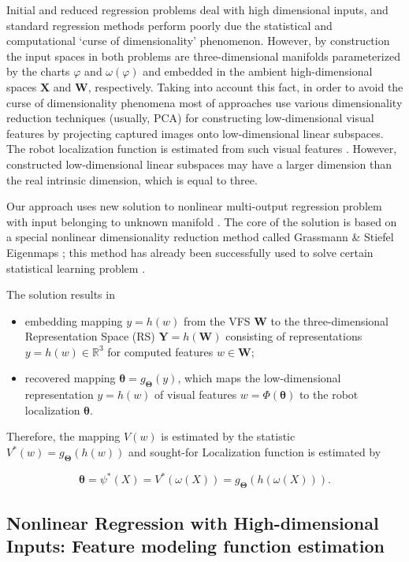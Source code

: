 \documentclass[conference]{IEEEtran} %
\def\mbW{\mathbf{W}}
\def\mbTheta{{\bm\Theta}}
\def\mbtheta{{\bm\theta}}
\def\mbX{\mathbf{X}}
\def\mbY{\mathbf{Y}}
\def\RR{\mathbb{R}}
\begin{document}
Initial and reduced regression problems deal with high dimensional inputs, and standard regression methods perform poorly due the statistical and computational `curse of dimensionality' phenomenon. However, by construction the input spaces in both problems are three-dimensional manifolds parameterized by the charts $\varphi$  and $\omega(\varphi)$ and embedded in the ambient high-dimensional spaces $\mbX$ and $\mbW$, respectively. Taking into account this fact, in order to avoid the curse of dimensionality phenomena most of approaches use various dimensionality reduction techniques (usually, PCA) for constructing low-dimensional visual features by projecting captured images onto low-dimensional linear subspaces. The robot localization function is estimated from such visual features \cite{bib11,bib13,bib14}. However, constructed low-dimensional linear subspaces may have a larger dimension than the real intrinsic dimension, which is equal to three.

Our approach uses new solution to nonlinear multi-output regression problem with input belonging to unknown manifold  \cite{bib20}. The core of the solution is based on a special nonlinear dimensionality reduction method called Grassmann \& Stiefel Eigenmaps \cite{bib21,bib22}; this method has already been successfully used to solve certain statistical learning problem \cite{bib23}.

The solution \cite{bib20} results in
\begin{itemize}
	\item embedding mapping $y = h(w)$ from the VFS $\mbW$ to the three-dimensional Representation Space (RS) $\mbY = h(\mbW)$ consisting of representations $y = h(w) \in \RR^3$ for computed features $w \in \mbW$;
    \item recovered mapping $\mbtheta= g_{\mbTheta}(y)$, which maps the low-dimensional representation $y = h(w)$ of visual features $w = \Phi(\mbtheta)$ to the robot localization $\mbtheta$.
\end{itemize}

Therefore, the mapping $V(w)$ is estimated by the statistic $V^*(w) = g_{\mbTheta}(h(w))$ and sought-for Localization function is estimated by

\begin{equation}
\label{eq6}
	\mbtheta = \psi^*(X) = V^*(\omega(X)) = g_{\mbTheta}(h(\omega(X))).
\end{equation}

\subsection{Nonlinear Regression with High-dimensional Inputs: Feature modeling function estimation}
\end{document}
